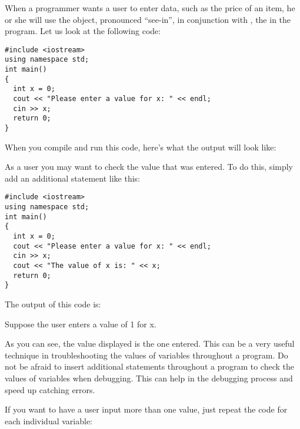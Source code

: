 
When a programmer wants a user to enter data, such as the price of an item, he or she will use the  object, pronounced ``see-in'', in conjunction with \Code{>>}, the  in the program. 
Let us look at the following code:

\noindent\begin{minipage}{\linewidth}\begin{lstlisting}
#include <iostream>
using namespace std;
int main()
{
  int x = 0;   				      
  cout << "Please enter a value for x: " << endl; 
  cin >> x;
  return 0;
}
\end{lstlisting}\end{minipage}

When you compile and run this code, here's what the output will look like:

\noindent {}

As a user you may want to check the value that was entered. 
To do this, simply add an additional  statement like this:

\noindent\begin{minipage}{\linewidth}\begin{lstlisting}
#include <iostream>
using namespace std;
int main()
{
  int x = 0;   				      
  cout << "Please enter a value for x: " << endl; 
  cin >> x;
  cout << "The value of x is: " << x;
  return 0;
}
\end{lstlisting}\end{minipage}

The output of this code is:

\noindent {}

Suppose the user enters a value of 1 for x.

\noindent {}

As you can see, the value displayed is the one entered. 
This can be a very useful technique in troubleshooting the values of variables throughout a program. 
Do not be afraid to insert additional  statements throughout a program to check the values of variables when debugging. 
This can help in the debugging process and speed up catching errors. 

If you want to have a user input more than one value, just repeat the code for each individual variable:

